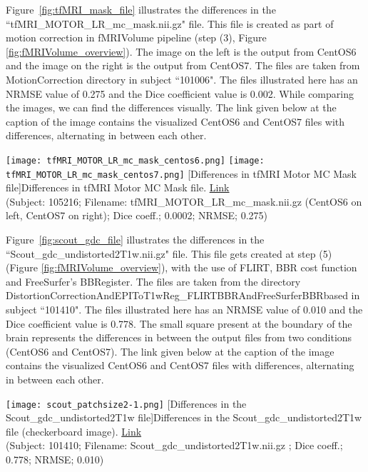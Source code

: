 Figure~\ref{fig:tfMRI_mask_file} illustrates the differences in the ``tfMRI\_MOTOR\_LR\_mc\_mask.nii.gz" file. This file is created as part of motion correction in fMRIVolume pipeline (step (3), Figure \ref{fig:fMRIVolume_overview}). The image on the left is the output from CentOS6 and the image on the right is the output from CentOS7. The files are taken from MotionCorrection directory in subject ``101006". The files illustrated here has an NRMSE value of 0.275 and the Dice coefficient value is 0.002. While comparing the images, we can find the differences visually.
The link given below at the caption of the image contains the visualized CentOS6 and CentOS7 files with differences, alternating in between each other.

\begin{center}
\texttt{[image: tfMRI\_MOTOR\_LR\_mc\_mask\_centos6.png]}%
\texttt{[image: tfMRI\_MOTOR\_LR\_mc\_mask\_centos7.png]}
  [Differences in tfMRI Motor MC Mask file]{Differences in tfMRI Motor MC Mask file. \href{https://drive.google.com/file/d/1_XpZnroleOlJmkvXHZA84iknT5UxtO14/view?usp=sharing}{Link}\\(Subject: 105216; Filename: tfMRI\_MOTOR\_LR\_mc\_mask.nii.gz (CentOS6 on left, CentOS7 on right); Dice coeff.; 0.0002; NRMSE; 0.275)}
\label{fig:tfMRI_mask_file}
\end{center}

Figure~\ref{fig:scout_gdc_file} illustrates the differences in the ``Scout\_gdc\_undistorted2T1w.nii.gz" file. This file gets created at step (5) (Figure \ref{fig:fMRIVolume_overview}), with the use of FLIRT, BBR cost function and FreeSurfer's BBRegister. The files are taken from the directory DistortionCorrectionAndEPIToT1wReg\_FLIRTBBRAndFreeSurferBBRbased in subject ``101410". The files illustrated here has an NRMSE value of 0.010 and the Dice coefficient value is 0.778. The small square present at the boundary of the brain represents the differences in between the output files from two conditions (CentOS6 and CentOS7). The link given below at the caption of the image contains the visualized CentOS6 and CentOS7 files with differences, alternating in between each other.

\begin{center}
\texttt{[image: scout\_patchsize2-1.png]}%
[Differences in the Scout\_gdc\_undistorted2T1w file]{Differences in the Scout\_gdc\_undistorted2T1w file (checkerboard image). \href{https://drive.google.com/file/d/1iRP6jVMKbGBLjLdEi3l5j4Q8Pngp5Nln/view?usp=sharing}{Link}\\(Subject: 101410; Filename: Scout\_gdc\_undistorted2T1w.nii.gz ; Dice coeff.; 0.778; NRMSE; 0.010)}
\label{fig:scout_gdc_file}
\end{center}

